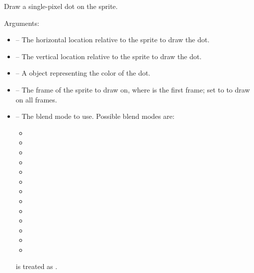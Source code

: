 \documentclass[letterpaper,10pt,english]{sphinxmanual}
\begin{document}
\begin{fulllineitems}
\label{gfx:sge.gfx.Sprite.draw_dot}
Draw a single-pixel dot on the sprite.

Arguments:
\begin{itemize}
\item {} 
 -- The horizontal location relative to the sprite to
draw the dot.

\item {} 
 -- The vertical location relative to the sprite to draw
the dot.

\item {} 
 -- A {\hyperref[gfx:sge.gfx.Color]{\emph{}}} object representing the
color of the dot.

\item {} 
 -- The frame of the sprite to draw on, where 
is the first frame; set to  to draw on all
frames.

\item {} 
 -- The blend mode to use.  Possible blend modes
are:
\begin{itemize}
\item {} 

\item {} 

\item {} 

\item {} 

\item {} 

\item {} 

\item {} 

\item {} 

\item {} 

\item {} 

\item {} 

\item {} 

\item {} 

\end{itemize}

 is treated as .

\end{itemize}

\end{fulllineitems}
\end{document}
